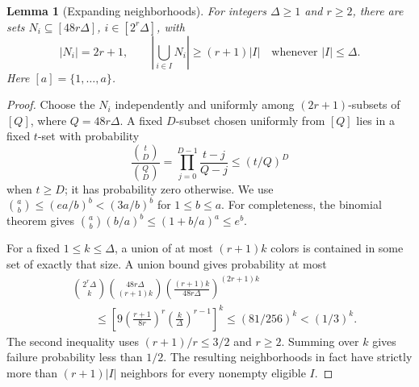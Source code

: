 \documentclass[11pt]{article}
\newtheorem{lemma}[theorem]{Lemma}
\theoremstyle{definition}
\theoremstyle{remark}
\newcommand{\abs}[1]{\left|#1\right|}
\begin{document}
\begin{lemma}[Expanding neighborhoods]\label{lem:expander}
For integers $\Delta\ge1$ and $r\ge2$, there are sets
$N_i\subseteq[48r\Delta]$, $i\in[2^r\Delta]$, with
\[
 \abs{N_i}=2r+1,\qquad
 \abs{\bigcup_{i\in I}N_i}\ge(r+1)\abs I
 \quad\text{whenever }\abs I\le\Delta.
\]
Here $[a]=\{1,\ldots,a\}$.
\end{lemma}
\begin{proof}
Choose the $N_i$ independently and uniformly among $(2r+1)$-subsets
of $[Q]$, where $Q=48r\Delta$. A fixed $D$-subset chosen uniformly from
$[Q]$ lies in a fixed $t$-set with probability
\[
 \frac{\binom tD}{\binom QD}
 =\prod_{j=0}^{D-1}\frac{t-j}{Q-j}\le(t/Q)^D
\]
when $t\ge D$; it has probability zero otherwise.
We use $\binom ab\le(ea/b)^b<(3a/b)^b$ for $1\le b\le a$.
For completeness, the binomial theorem gives
$\binom ab(b/a)^b\le(1+b/a)^a\le e^b$.

For a fixed $1\le k\le\Delta$, a union of at most $(r+1)k$ colors is
contained in some set of exactly that size. A union bound gives probability
at most
\begin{align*}
 &\binom{2^r\Delta}{k}\binom{48r\Delta}{(r+1)k}
 \left(\frac{(r+1)k}{48r\Delta}\right)^{(2r+1)k}\\
 &\qquad\le
 \left[9\left(\frac{r+1}{8r}\right)^r
              \left(\frac{k}{\Delta}\right)^{r-1}\right]^k
 \le(81/256)^k<(1/3)^k.
\end{align*}
The second inequality uses $(r+1)/r\le3/2$ and $r\ge2$.
Summing over $k$ gives failure probability less than $1/2$.
The resulting neighborhoods in fact have strictly more than
$(r+1)\abs I$ neighbors for every nonempty eligible $I$.
\end{proof}
\end{document}
